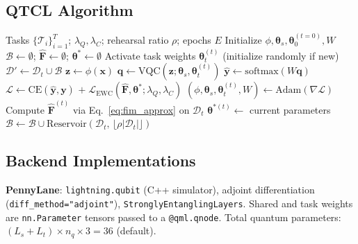 \documentclass[a4paper,nopdfoutputerror]{quantumarticle}
\begin{document}
\subsection{QTCL Algorithm}

\begin{algorithm}[t]
\caption{QTCL: Joint Fisher EWC + Rehearsal for Hybrid QML}
\label{alg:qtcl}
\begin{algorithmic}[1]
\Require Tasks $\{\mathcal{T}_i\}_{i=1}^T$;
         $\lambda_Q, \lambda_C$; rehearsal ratio $\rho$; epochs $E$
\State Initialize $\phi, \boldsymbol\theta_s, \boldsymbol\theta_0^{(t=0)}, W$
\State $\mathcal{B} \leftarrow \emptyset$;
       $\hat{\mathbf{F}} \leftarrow \emptyset$;
       $\boldsymbol\theta^* \leftarrow \emptyset$
  \State Activate task weights $\boldsymbol\theta_t^{(t)}$
         (initialize randomly if new)
  \State $\mathcal{D}' \leftarrow \mathcal{D}_t \cup \mathcal{B}$
      \State $\mathbf{z} \leftarrow \phi(\mathbf{x})$
      \State $\mathbf{q} \leftarrow \mathrm{VQC}(\mathbf{z};
             \boldsymbol\theta_s,\boldsymbol\theta_t^{(t)})$
      \State $\hat{\mathbf{y}} \leftarrow \mathrm{softmax}(W\mathbf{q})$
      \State $\mathcal{L} \leftarrow \mathrm{CE}(\hat{\mathbf{y}},\mathbf{y})$
             $+\;\mathcal{L}_\mathrm{EWC}(\hat{\mathbf{F}},
             \boldsymbol\theta^*;\lambda_Q,\lambda_C)$
      \State $(\phi,\boldsymbol\theta_s,\boldsymbol\theta_t^{(t)},W)
             \leftarrow \mathrm{Adam}(\nabla\mathcal{L})$
    \EndFor
  \EndFor
  \State Compute $\hat{\mathbf{F}}^{(t)}$
         via Eq.~\ref{eq:fim_approx} on $\mathcal{D}_t$
  \State $\boldsymbol\theta^{*(t)} \leftarrow$ current parameters
  \State $\mathcal{B} \leftarrow \mathcal{B}\cup
         \mathrm{Reservoir}(\mathcal{D}_t,\,\lfloor\rho|\mathcal{D}_t|\rfloor)$
\EndFor
\end{algorithmic}
\end{algorithm}

\subsection{Backend Implementations}

\textbf{PennyLane}: \texttt{lightning.qubit} (C++ simulator), adjoint differentiation
(\texttt{diff\_method="adjoint"}), \texttt{StronglyEntanglingLayers}.
Shared and task weights are \texttt{nn.Parameter} tensors passed to a
\texttt{@qml.qnode}.
Total quantum parameters: $(L_s + L_t) \times n_q \times 3 = 36$ (default).
\end{document}
